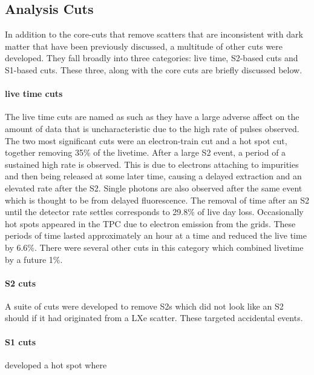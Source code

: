 \subsection{Analysis Cuts}
\par
In addition to the core-cuts that remove scatters that are inconsistent with dark matter that have been previously discussed, a multitude of other cuts were developed.
They fall broadly into three categories: live time, S2-based cuts and S1-based cuts.
These three, along with the core cuts are briefly discussed below.

\paragraph{live time cuts}
The live time cuts are named as such as they have a large adverse affect on the amount of data that is uncharacteristic due to the high rate of pulses observed.
The two most significant cuts were an electron-train cut and a hot spot cut, together removing 35\% of the livetime.
After a large S2 event, a period of a sustained high rate is observed. 
This is due to electrons attaching to impurities and then being released at some later time, causing a delayed extraction and an elevated rate after the S2.
Single photons are also observed after the same event which is thought to be from delayed fluorescence.
The removal of time after an S2 until the detector rate settles corresponds to 29.8\% of live day loss.
Occasionally hot spots appeared in the TPC due to electron emission from the grids. 
These periods of time lasted approximately an hour at a time and reduced the live time by 6.6\%.
There were several other cuts in this category which combined livetime by a future 1\%.

\paragraph{S2 cuts}
A suite of cuts were developed to remove S2s which did not look like an S2 should if it had originated from a LXe scatter.
These targeted accidental events.

\paragraph{S1 cuts}


developed a hot spot where 

